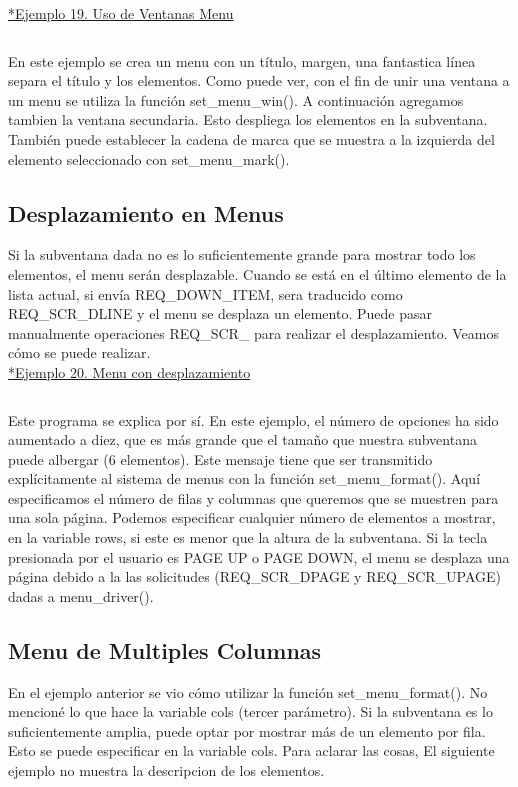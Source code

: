 \documentclass{article}
\begin{document}
\href{https://github.com/nasciiboy/NCURSES-Programming-HOWTO/blob/master/ncurses_programs/menus/menu_win.c}{*Ejemplo 19. Uso de Ventanas Menu}
\inputminted{cpp}{./cpp/019_uso_ventanas_menu.cpp}

En este ejemplo se crea un menu con un título, margen, una fantastica línea
separa el título y los elementos. Como puede ver, con el fin de unir una
ventana a un menu se utiliza la función set\_menu\_win(). A continuación
agregamos tambien la ventana secundaria. Esto despliega los elementos en la
subventana. También puede establecer la cadena de marca que se muestra a la
izquierda del elemento seleccionado con set\_menu\_mark().

\subsection{Desplazamiento en Menus}%
Si la subventana dada no es lo suficientemente grande para mostrar todo los
elementos, el menu serán desplazable. Cuando se está en el último elemento de
la lista actual, si envía REQ\_DOWN\_ITEM, sera traducido como REQ\_SCR\_DLINE y el
menu se desplaza un elemento. Puede pasar manualmente operaciones REQ\_SCR\_ para
realizar el desplazamiento. Veamos cómo se puede realizar.\\

\href{https://github.com/nasciiboy/NCURSES-Programming-HOWTO/blob/master/ncurses_programs/menus/menu_scroll.c}{*Ejemplo 20. Menu con desplazamiento}
\inputminted{cpp}{./cpp/020_desplazamiento_menu.cpp}

Este programa se explica por sí. En este ejemplo, el número de opciones ha sido
aumentado a diez, que es más grande que el tamaño que nuestra subventana puede
albergar (6 elementos). Este mensaje tiene que ser transmitido explícitamente
al sistema de menus con la función set\_menu\_format(). Aquí especificamos el
número de filas y columnas que queremos que se muestren para una sola página.
Podemos especificar cualquier número de elementos a mostrar, en la variable
rows, si este es menor que la altura de la subventana. Si la tecla presionada
por el usuario es PAGE UP o PAGE DOWN, el menu se desplaza una página debido a
la las solicitudes (REQ\_SCR\_DPAGE y REQ\_SCR\_UPAGE) dadas a menu\_driver().

\subsection{Menu de Multiples Columnas}%
En el ejemplo anterior se vio cómo utilizar la función set\_menu\_format(). No
mencioné lo que hace la variable cols (tercer parámetro). Si la subventana es
lo suficientemente amplia, puede optar por mostrar más de un elemento por fila.
Esto se puede especificar en la variable cols. Para aclarar las cosas, El
siguiente ejemplo no muestra la descripcion de los elementos.\\
\end{document}
